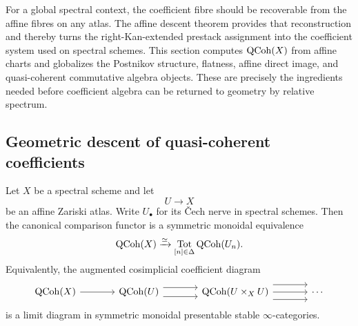 For a global spectral context, the coefficient fibre should be recoverable
from the affine fibres on any atlas. The affine descent theorem provides that
reconstruction and thereby turns the right-Kan-extended prestack assignment
into the coefficient system used on spectral schemes. This section computes
\(\operatorname{QCoh}(X)\) from affine charts and globalizes the Postnikov structure,
flatness, affine direct image, and quasi-coherent commutative algebra objects.
These are precisely the ingredients needed before coefficient algebra can be
returned to geometry by relative spectrum.

\subsection{Geometric descent of quasi-coherent coefficients}

\begin{theorem}
\label{thm:qcoh-atlas-computation}
Let $X$ be a spectral scheme and let
\[
    U
    \longrightarrow
    X
\]
be an affine Zariski atlas. Write $U_\bullet$ for its \v{C}ech nerve in
spectral schemes. Then the canonical comparison functor is a symmetric
monoidal equivalence
\[
    \operatorname{QCoh}(X)
    \xrightarrow{\simeq}
    \operatorname*{Tot}_{[n]\in\Delta}
    \operatorname{QCoh}(U_n).
\]
Equivalently, the augmented cosimplicial coefficient diagram
\[
\begin{tikzcd}[column sep=large]
    \QCoh(X)
        \arrow[r]
    &
    \QCoh(U)
        \arrow[r, shift left=1.1ex]
        \arrow[r, shift right=1.1ex]
    &
    \QCoh(U\times_XU)
        \arrow[r, shift left=1.8ex]
        \arrow[r]
        \arrow[r, shift right=1.8ex]
    &
    \cdots
\end{tikzcd}
\]
is a limit diagram in symmetric monoidal presentable stable
\(\infty\)-categories.
\end{theorem}

